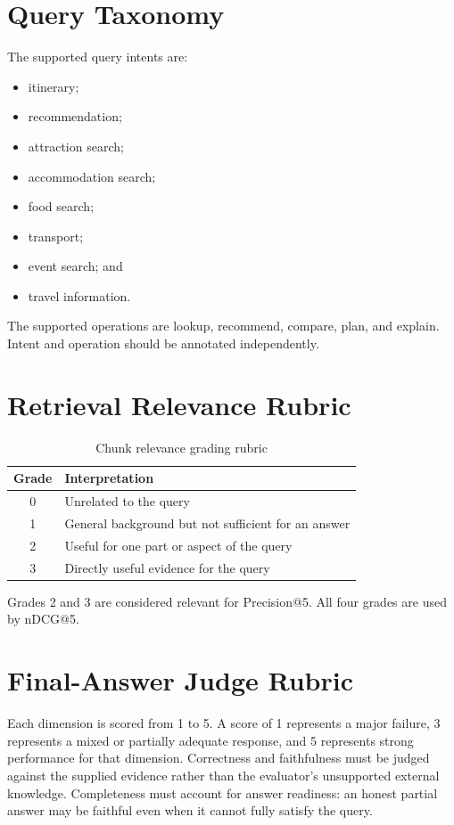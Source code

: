 \section{Query Taxonomy}

The supported query intents are:

\begin{itemize}
    \item itinerary;
    \item recommendation;
    \item attraction search;
    \item accommodation search;
    \item food search;
    \item transport;
    \item event search; and
    \item travel information.
\end{itemize}

The supported operations are lookup, recommend, compare, plan, and explain.
Intent and operation should be annotated independently.

\section{Retrieval Relevance Rubric}

\begin{table}[H]
\centering
\caption{Chunk relevance grading rubric}
\begin{tabular}{cl}
\hline
\textbf{Grade} & \textbf{Interpretation} \\
\hline
0 & Unrelated to the query \\
1 & General background but not sufficient for an answer \\
2 & Useful for one part or aspect of the query \\
3 & Directly useful evidence for the query \\
\hline
\end{tabular}
\end{table}

Grades 2 and 3 are considered relevant for Precision@5. All four grades are
used by nDCG@5.

\section{Final-Answer Judge Rubric}

Each dimension is scored from 1 to 5. A score of 1 represents a major failure,
3 represents a mixed or partially adequate response, and 5 represents strong
performance for that dimension. Correctness and faithfulness must be judged
against the supplied evidence rather than the evaluator's unsupported external
knowledge. Completeness must account for answer readiness: an honest partial
answer may be faithful even when it cannot fully satisfy the query.

